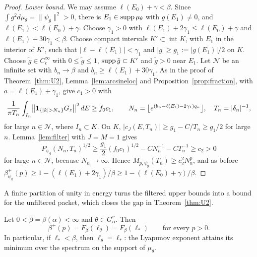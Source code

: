 \begin{proof}
\emph{Lower bound.} We may assume $\ell(E_0)+\gamma<\beta$. Since $\int g^2d\mu_\theta=\|\psi_g\|^2>0$, there is $E_1\in\operatorname{supp}\mu_\theta$ with $g(E_1)\ne0$, and $\ell(E_1)<\ell(E_0)+\gamma$. Choose $\gamma_1>0$ with $\ell(E_1)+2\gamma_1\le\ell(E_0)+\gamma$ and $\ell(E_1)+30\gamma_1<\beta$. Choose compact intervals $K'\subset\operatorname{int}K$, with $E_1$ in the interior of $K'$, such that $|\ell-\ell(E_1)|<\gamma_1$ and $|g|\ge g_1:=|g(E_1)|/2$ on $K$. Choose $\tilde g\in C_c^\infty$ with $0\le\tilde g\le1$, $\operatorname{supp}\tilde g\subset K'$ and $\tilde g>0$ near $E_1$. Let $\mathcal N$ be an infinite set with $b_n\to\beta$ and $b_n\ge\ell(E_1)+30\gamma_1$. As in the proof of Theorem~\ref{thm:U2}, Lemma~\ref{lem:arcsineloc} and Proposition~\ref{prop:fraction}, with $a=\ell(E_1)+\gamma_1$, give $c_1>0$ with
\[
\frac1{\pi T_n}\int_{I_n}\bigl\|\un_{\{|k|>N_n\}}G_z\bigr\|^2\,dE\ge f_0c_1,\qquad N_n=\bigl\lfloor e^{(b_n-\ell(E_1)-2\gamma_1)q_n}\bigr\rfloor,\quad T_n=|\delta_n|^{-1},
\]
for large $n\in\mathcal N$, where $I_n\subset K$. On $K$, $|c_J(E,T_n)|\ge g_1-C/T_n\ge g_1/2$ for large $n$. Lemma~\ref{lem:filter} with $J=M=1$ gives
\[
P_{\psi_g}(N_n,T_n)^{1/2}\ge\frac{g_1}2(f_0c_1)^{1/2}-CN_n^{-1}-CT_n^{-1}\ge c_2>0
\]
for large $n\in\mathcal N$, because $N_n\to\infty$. Hence $M_{p,\psi_g}(T_n)\ge c_2^2N_n^p$, and as before $\beta^+_{\psi_g}(p)\ge1-(\ell(E_1)+2\gamma_1)/\beta\ge1-(\ell(E_0)+\gamma)/\beta$.
\end{proof}

A finite partition of unity in energy turns the filtered upper bounds into a bound for the unfiltered packet, which closes the gap in Theorem~\ref{thm:U2}.

\begin{corollary}\label{cor:allmoments}
Let $0<\beta=\beta(\alpha)<\infty$ and $\theta\in G^v_\alpha$. Then
\[
\beta^+(p)=F_\beta(\ell_\theta)=F_\beta(\ell_*)\qquad\text{for every }p>0.
\]
In particular, if $\ell_*<\beta$, then $\ell_\theta=\ell_*$: the Lyapunov exponent attains its minimum over the spectrum on the support of $\mu_\theta$.
\end{corollary}

